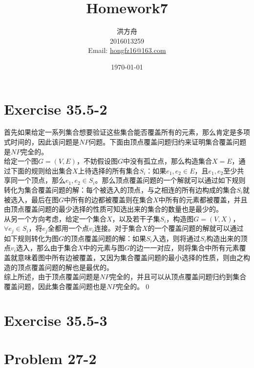 \documentclass{article}
\title{Homework7}
\author{洪方舟\\2016013259\\Email: \href{mailto:hongfz16@163.com}{hongfz16@163.com}}
\date{\today}
\begin{document}
  \maketitle
  \section*{Exercise 35.5-2}
  \indent 首先如果给定一系列集合想要验证这些集合能否覆盖所有的元素，那么肯定是多项式时间的，因此该问题是$NP$问题。下面由顶点覆盖问题归约来证明集合覆盖问题是$NP$完全的。\\
  \indent 给定一个图$G=(V,E)$，不妨假设图$G$中没有孤立点，那么构造集合$X=E$，通过下面的规则给出集合$X$上待选择的所有集合$S_i$：如果$e_1,e_2 \in E$，且$e_1,e_2$至少共享同一个顶点，那么$e_1,e_2 \in S_i$。那么顶点覆盖问题的一个解就可以通过如下规则转化为集合覆盖问题的解：每个被选入的顶点，与之相连的所有边构成的集合$S_i$就被选入，最后在图$G$中所有的边都被覆盖则在集合$X$中所有的元素都被覆盖，并且由顶点覆盖问题的最少选择的性质可知选出来的集合的数量也是最少的。\\
  \indent 从另一个方向考虑，给定一个集合$X$，以及若干子集$S_i$，构造图$G=(V,X)$，$\forall e_j \in S_i$，将$e_j$全都用一个点$v_i$连接。对于集合$X$的一个覆盖问题的解就可以通过如下规则转化为图$G$的顶点覆盖问题的解：如果$S_i$入选，则将通过$S_i$构造出来的顶点$v_i$选入，那么由于集合$X$中的元素与图$G$的边一一对应，则将集合中所有元素覆盖就意味着图中所有边被覆盖，又因为集合覆盖问题的最小选择的性质，则由之构造的顶点覆盖问题的解也是最优的。\\
  \indent 综上所述，由于顶点覆盖问题是$NP$完全的，并且可以从顶点覆盖问题归约到集合覆盖问题，因此集合覆盖问题也是$NP$完全的。\qed
  \section*{Exercise 35.5-3}
  
  \section*{Problem 27-2}
\end{document}
